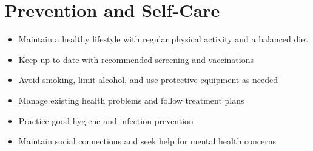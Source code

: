 \section*{Prevention and Self-Care}
\begin{itemize}
    \item Maintain a healthy lifestyle with regular physical activity and a balanced diet
    \item Keep up to date with recommended screening and vaccinations
    \item Avoid smoking, limit alcohol, and use protective equipment as needed
    \item Manage existing health problems and follow treatment plans
    \item Practice good hygiene and infection prevention
    \item Maintain social connections and seek help for mental health concerns
\end{itemize}
